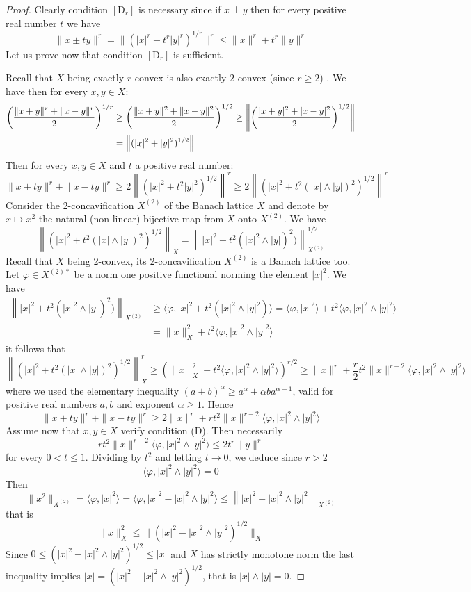 \documentclass[11pt]{amsart}
\theoremstyle{plain}
\theoremstyle{remark}
\newcommand{\ph}{\varphi}
\begin{document}
\begin{proof} Clearly condition $[\mathrm D_r]$ is necessary since if $x\perp y$ then for every positive real number 
$t$ we have
$$\|x\pm ty\|^r=\|(|x|^r+t^r|y|^r)^{1/r}\|^r\le \|x\|^r+t^r\|y\|^r$$
Let us prove now that condition $[\mathrm D_r]$ is sufficient.

Recall that $X$ being exactly $r$-convex is also exactly $2$-convex (since $r\ge 2$) \cite[Prop.~1.d.5]{LT}. We have then for every $x,y\in X$:
\begin{align*}
\left({\|x+y\|^r+\|x-y\|^r\over 2}\right)^{1/r}&\ge \left({\|x+y\|^2+\|x-y\|^2\over 2}\right)^{1/2}  
\ge \left\|\left({|x+y|^2+|x-y|^2\over 2}\right)^{1/2}\right\|  \\ &= \left\|(|x|^2+|y|^2)^{1/2}\right\|
\end{align*}
Then for every $x,y\in X$ and $t$ a positive real number:
\[
\|x+ty\|^r+\|x-ty\|^r\ge 2\left\|(|x|^2+t^2|y|^2)^{1/2}\right\|^r \ge 2\left\|(|x|^2+t^2(|x|\wedge |y|)^2)^{1/2} 
\right\|^r
\]
Consider the 2-concavification $X^{(2)}$ of the Banach lattice $X$ and denote by $x\mapsto x^2$ the natural (non-linear) bijective map from $X$ onto $X^{(2)}$. We have
$$\left\|(|x|^2+t^2(|x|\wedge |y|)^2)^{1/2}\right\|_X=\left\||x|^2+t^2(|x|^2\wedge |y|)^2)\right\|^{1/2}_{X^{(2)}}$$
Recall that $X$ being 2-convex,  its 2-concavification $X^{(2)}$ is a Banach lattice too. Let $\ph\in  X^{(2)*}$ be a norm one positive functional norming the element $|x|^2$. We have
\begin{align*}
\left\||x|^2+t^2(|x|^2\wedge |y|)^2)\right\|_{X^{(2)}} &\ge \langle\ph, |x|^2+t^2(|x|^2\wedge |y|^2)\rangle = \langle \ph, |x|^2\rangle + t^2\langle \ph, |x|^2\wedge |y|^2\rangle \\
&= \|x\|_X^2+ t^2\langle \ph, |x|^2\wedge |y|^2\rangle
\end{align*}
it follows that
\[
\left\|(|x|^2+t^2(|x|\wedge |y|)^2)^{1/2}\right\|_X^r\ge \left(\|x\|_X^2+ t^2\langle \ph, |x|^2\wedge |y|^2\rangle\right)^{r/2}\ge \|x\|^r+\frac r2 t^2\|x\|^{r-2} \langle \ph, |x|^2\wedge |y|^2\rangle
\]
where we used the elementary inequality $(a+b)^\alpha\ge a^\alpha+\alpha ba^{\alpha-1}$, valid for positive real numbers $a,b$ and exponent $\alpha\ge 1$. Hence
$$\|x+ty\|^r+\|x-ty\|^r\ge 2\|x\|^r+r t^2\|x\|^{r-2} \langle \ph, |x|^2\wedge |y|^2\rangle $$
Assume now that $x,y\in X$ verify condition (D). Then necessarily
$$r t^2\|x\|^{r-2} \langle \ph, |x|^2\wedge |y|^2\rangle\le 2 t^r\|y\|^r$$
for every $0<t\le 1$. Dividing by  $t^2$ and letting $t\to 0$, we deduce since $r>2$ 
$$ \langle \ph, |x|^2\wedge |y|^2\rangle=0$$
Then
$$\|x^2\|_{X^{(2)}}=\langle \ph, |x|^2\rangle= \langle \ph, |x|^2-|x|^2\wedge |y|^2\rangle 
\le \left\||x|^2-|x|^2\wedge |y|^2 \right\|_{X^{(2)}} $$
that is
$$\|x\|^2_X\le  \|(|x|^2-|x|^2\wedge |y|^2)^{1/2} \|_X$$
Since $0\le (|x|^2-|x|^2\wedge |y|^2)^{1/2} \le |x|$ and $X$ has strictly monotone norm the last inequality implies
$|x|=(|x|^2-|x|^2\wedge |y|^2)^{1/2}$, that is $|x|\wedge |y|=0$.
\end{proof}
\end{document}
